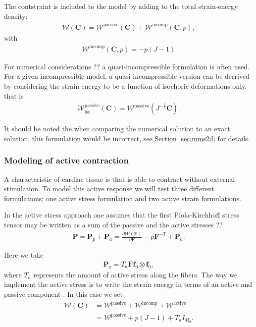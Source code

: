 \documentclass[a4paper,10pt]{article}
\newcommand{\ef}{\mathbf{f}_0}
\newcommand{\C}{\mathbf{C}}
\newcommand{\F}{\mathbf{F}}
\newcommand{\FPiola}{\mathbf{P}}
\begin{document}
The contstraint is included to the model by adding to the total strain-energy density:
\begin{align}
\mathcal{W}(\C) = \mathcal{W}^{\text{passive}}(\C) + \mathcal{W}^{\text{incomp}}(\C, p),
\end{align}
with 
\begin{align}
\mathcal{W}^{\text{incomp}}(\C, p) = - p (J-1)
\end{align}


For numerical considerations ?? a quasi-incompressible formulation %
is often used. For a given incompressible model, a quasi-incompressible version can be
derrived by considering the strain-energy to be a function of isochoric deformations only, 
that is  
\begin{align}
\mathcal{W}^{\text{passive}}_{\text{iso}}(\C) = \mathcal{W}^{\text{passive}}(J^{-\frac{2}{3}}\C).
\label{eq:quasi-incompressible}
\end{align} 

It should be noted the when comparing the numerical solution to an exact solution, 
this formulation would be incorrect, see Section \ref{sec:mms2d} for details. 


\subsubsection{Modeling of active contraction}

A characteristic of cardiac tissue is that is able to contract without 
external stimulation. To model this active response we will test three different
formulations; one active stress formulation and two active strain formulations.

In the active stress approach one assumes that the first Piola-Kirchhoff stress tensor
may be written as a sum of the passive and the active stresses ??%
\begin{align}
  \FPiola = \FPiola_p + \FPiola_a =  \frac{\partial \mathcal{W}(\F) }{\partial \F} - p\F^{-T} +  \FPiola_a.
\label{eq:active_stress_formulation}
\end{align}

Here we take 
\begin{align}
\FPiola_a = T_a \F  \ef \otimes \ef,
\end{align}
where $T_a$ represents the amount of active stress along the fibers.
The way we implement the active stress is to write the strain energy in terms of an active and
passive component \cite{pathmanathan2010cardiac}. 
In this case we set
\begin{align*}
 \mathcal{W}(\C) &= \mathcal{W}^{\text{passive}} + \mathcal{W}^{\text{incomp}} + \mathcal{W}^{\text{active}} \\
& = \mathcal{W}^{\text{passive}} + p(J-1) + T_a I_{4\ef}.
\label{eq:active_stress_strain_energy}
\end{align*}
\end{document}
